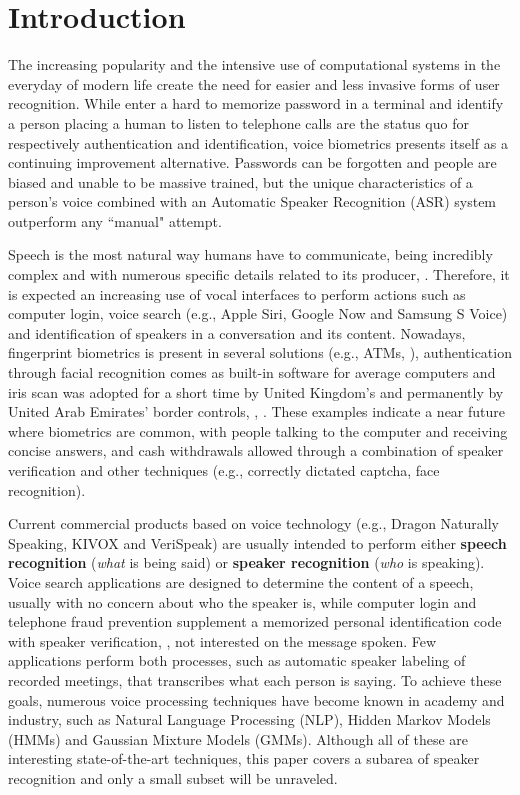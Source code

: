 \chapter{Introduction}
\label{ch:intro}

The increasing popularity and the intensive use of computational systems in the everyday of modern life create the need for easier and less invasive forms of user recognition. While enter a hard to memorize password in a terminal and identify a person placing a human to listen to telephone calls are the status quo for respectively authentication and identification, voice biometrics presents itself as a continuing improvement alternative. Passwords can be forgotten and people are biased and unable to be massive trained, but the unique characteristics of a person's voice combined with an Automatic Speaker Recognition (ASR) system outperform any ``manual" attempt.

Speech is the most natural way humans have to communicate, being incredibly complex and with numerous specific details related to its producer, . Therefore, it is expected an increasing use of vocal interfaces to perform actions such as computer login, voice search (e.g., Apple Siri, Google Now and Samsung S Voice) and identification of speakers in a conversation and its content. Nowadays, fingerprint biometrics is present in several solutions (e.g., ATMs, ), authentication through facial recognition comes as built-in software for average computers and iris scan was adopted for a short time by United Kingdom's and permanently by United Arab Emirates' border controls, , . These examples indicate a near future where biometrics are common, with people talking to the computer and receiving concise answers, and cash withdrawals allowed through a combination of speaker verification and other techniques (e.g., correctly dictated captcha, face recognition).

Current commercial products based on voice technology (e.g., Dragon Naturally Speaking, KIVOX and VeriSpeak) are usually intended to perform either \textbf{speech recognition} (\emph{what} is being said) or \textbf{speaker recognition} (\emph{who} is speaking). Voice search applications are designed to determine the content of a speech, usually with no concern about who the speaker is, while computer login and telephone fraud prevention supplement a memorized personal identification code with speaker verification, , not interested on the message spoken. Few applications perform both processes, such as automatic speaker labeling of recorded meetings, that transcribes what each person is saying. To achieve these goals, numerous voice processing techniques have become known in academy and industry, such as Natural Language Processing (NLP), Hidden Markov Models (HMMs) and Gaussian Mixture Models (GMMs). Although all of these are interesting state-of-the-art techniques, this paper covers a subarea of speaker recognition and only a small subset will be unraveled.

